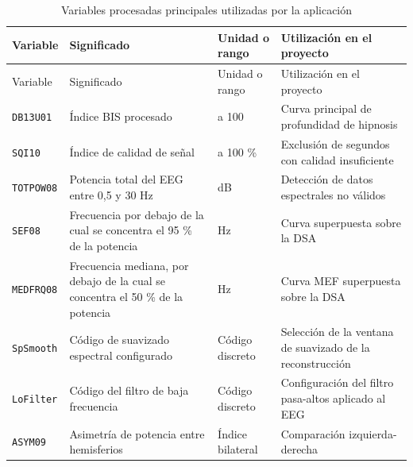 \documentclass[
  spanish,
  a4paper,
  12pt,
  twoside]{memoir}
\begin{document}
\begin{longtable}[]{@{}
  >{\raggedright\arraybackslash}p{}
  >{\raggedright\arraybackslash}p{}
  >{\raggedright\arraybackslash}p{}
  >{\raggedright\arraybackslash}p{}@{}}
\caption{Variables procesadas principales utilizadas por la
aplicación}\label{tbl-variables-principales}\tabularnewline
\toprule\noalign{}
\begin{minipage}[b]{\linewidth}\raggedright
Variable
\end{minipage} & \begin{minipage}[b]{\linewidth}\raggedright
Significado
\end{minipage} & \begin{minipage}[b]{\linewidth}\raggedright
Unidad o rango
\end{minipage} & \begin{minipage}[b]{\linewidth}\raggedright
Utilización en el proyecto
\end{minipage} \\
\midrule\noalign{}
\endfirsthead
\toprule\noalign{}
\begin{minipage}[b]{\linewidth}\raggedright
Variable
\end{minipage} & \begin{minipage}[b]{\linewidth}\raggedright
Significado
\end{minipage} & \begin{minipage}[b]{\linewidth}\raggedright
Unidad o rango
\end{minipage} & \begin{minipage}[b]{\linewidth}\raggedright
Utilización en el proyecto
\end{minipage} \\
\midrule\noalign{}
\endhead
\bottomrule\noalign{}
\endlastfoot
\texttt{DB13U01} & Índice BIS procesado & 0 a 100 & Curva principal de
profundidad de hipnosis \\
\texttt{SQI10} & Índice de calidad de señal & 0 a 100 \% & Exclusión de
segundos con calidad insuficiente \\
\texttt{TOTPOW08} & Potencia total del EEG entre 0,5 y 30 Hz & dB &
Detección de datos espectrales no válidos \\
\texttt{SEF08} & Frecuencia por debajo de la cual se concentra el 95 \%
de la potencia & Hz & Curva superpuesta sobre la DSA \\
\texttt{MEDFRQ08} & Frecuencia mediana, por debajo de la cual se
concentra el 50 \% de la potencia & Hz & Curva MEF superpuesta sobre la
DSA \\
\texttt{SpSmooth} & Código de suavizado espectral configurado & Código
discreto & Selección de la ventana de suavizado de la reconstrucción \\
\texttt{LoFilter} & Código del filtro de baja frecuencia & Código
discreto & Configuración del filtro pasa-altos aplicado al EEG \\
\texttt{ASYM09} & Asimetría de potencia entre hemisferios & Índice
bilateral & Comparación izquierda-derecha \\
\end{longtable}
\end{document}
